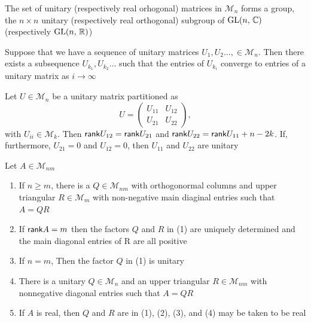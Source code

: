 \documentclass[aspectratio=169]{beamer}
\begin{document}
\begin{frame}
\begin{theorem}
 The set of unitary (respectively real orhogonal) matrices in $\mathcal{M}_n$ forms a group, the $n\times n$ unitary (respectively real orthogonal) subgroup of $\operatorname{GL}(n,\, \mathbb{C})$ (respectively $\operatorname{GL}(n,\, \mathbb{R})$)
\end{theorem}
\vfill
\begin{theorem}
Suppose that we have a sequence of unitary matrices $U_1, U_2 \ldots, \in \mathcal{M}_n$. Then there exists a subsequence $U_{k_1}, U_{k_2}\ldots $ such that the entries of $U_{k_i}$ converge to entries of a unitary matrix as $i\to \infty$
\end{theorem}
\end{frame}


\begin{frame}
\begin{lemma}
Let $U\in \mathcal{M}_n$ be a unitary matrix partitioned as 
\[U=\begin{pmatrix}
U_{11}& U_{12}\\
U_{21}& U_{22}
\end{pmatrix},\]
with $U_{ii}\in \mathcal{M}_k$. Then $\mathsf{rank} U_{12}= \mathsf{rank} U_{21}$ and $\mathsf{rank} U_{22}=\mathsf{rank} U_{11}+n -2k$. If, furthermore, $U_{21}=0$ and $U_{12}=0$, then $U_{11}$ and $U_{22}$ are unitary
\end{lemma}
\end{frame}


\begin{frame}
\begin{theorem}[QR factorisation]
 Let $A\in \mathcal{M}_{nm}$
 \begin{enumerate}
     \item If $n \geq m$, there is a $Q\in \mathcal{M}_{nm}$ with orthogonormal columns and upper triangular $R\in \mathcal{M}_m$ with non-negative main diaginal entries such that $A=QR$
     \item If $\mathsf{rank} A=m $  then the factors $Q$ and $R$ in (1) are uniquely determined and the main diagonal entries of R are all positive
     \item If $n=m$, Then the factor $Q$ in (1) is unitary
     \item There is a unitary $Q \in  \mathcal{M}_n$ and an upper triangular $R \in  \mathcal{M}_{nm}$ with nonnegative diagonal entries such that $A = Q R$
     \item If $A$ is real, then $Q$ and $R$ are in (1), (2), (3), and (4) may be taken to be real
 \end{enumerate}
\end{theorem}
\end{frame}
\end{document}

